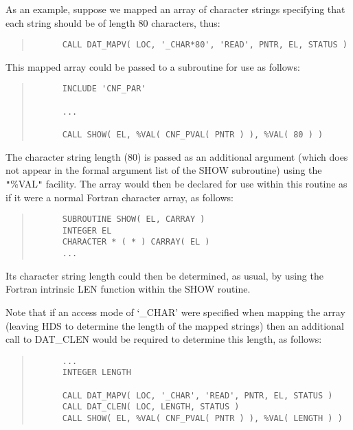 \documentclass[11pt]{article}
\newcommand{\htmlref}[2]{#1}
\newcommand{\qt}[1]{``#1''}
\renewcommand{\qt}[1]{{\tt{"}}#1{\tt{"}}}
\begin{document}
As an example, suppose we mapped an array of character strings
specifying that each string should be of length 80 characters, thus:

\small
\begin{quote}
\begin{verbatim}
      CALL DAT_MAPV( LOC, '_CHAR*80', 'READ', PNTR, EL, STATUS )
\end{verbatim}
\end{quote}
\normalsize

This mapped array could be passed to a subroutine for use as follows:

\small
\begin{quote}
\begin{verbatim}
      INCLUDE 'CNF_PAR'

      ...

      CALL SHOW( EL, %VAL( CNF_PVAL( PNTR ) ), %VAL( 80 ) )
\end{verbatim}
\end{quote}
\normalsize

The character string length (80) is passed as an additional argument
(which does not appear in the formal argument list of the SHOW
subroutine) using the \qt{\%VAL} facility. The array would then be
declared for use within this routine as if it were a normal Fortran
character array, as follows:

\small
\begin{quote}
\begin{verbatim}
      SUBROUTINE SHOW( EL, CARRAY )
      INTEGER EL
      CHARACTER * ( * ) CARRAY( EL )
      ...
\end{verbatim}
\end{quote}
\normalsize

Its character string length could then be determined, as usual, by
using the Fortran intrinsic LEN function within the SHOW routine.

Note that if an access mode of `\_CHAR' were specified when mapping
the array (leaving HDS to determine the length of the mapped strings)
then an additional call to \htmlref{DAT\_CLEN}{DAT_CLEN} would be
required to determine this length, as follows:

\small
\begin{quote}
\begin{verbatim}
      ...
      INTEGER LENGTH

      CALL DAT_MAPV( LOC, '_CHAR', 'READ', PNTR, EL, STATUS )
      CALL DAT_CLEN( LOC, LENGTH, STATUS )
      CALL SHOW( EL, %VAL( CNF_PVAL( PNTR ) ), %VAL( LENGTH ) )
\end{verbatim}
\end{quote}
\normalsize
\end{document}
